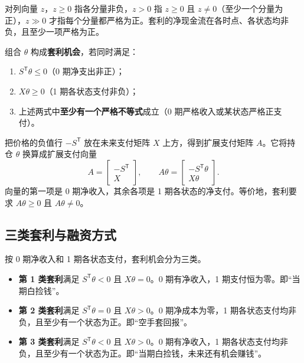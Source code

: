\begin{tcolorbox}[knowledge,title=向量不等号与净现金流]
对列向量 $z$，$z\ge0$ 指各分量非负，$z>0$ 指 $z\ge0$ 且 $z\ne0$（至少一个分量为正），$z\gg0$ 才指每个分量都严格为正。套利的净现金流在各时点、各状态均非负，且至少一项严格为正。
\end{tcolorbox}

\begin{tcolorbox}[knowledge]
组合 $\theta$ 构成\textbf{套利机会}，若同时满足：
\begin{enumerate}
    \item $S^{\mathsf T}\theta\le 0$（0 期净支出非正）；
    \item $X\theta\ge 0$（1 期各状态支付非负）；
    \item 上述两式中\textbf{至少有一个严格不等式}成立（0 期严格收入或某状态严格正支付）。
\end{enumerate}
把价格的负值行 $-S^{\mathsf T}$ 放在未来支付矩阵 $X$ 上方，得到扩展支付矩阵 $A$。它将持仓 $\theta$ 换算成扩展支付向量
\[
 A=\begin{bmatrix}-S^{\mathsf T}\\ X\end{bmatrix},
 \qquad
 A\theta=\begin{bmatrix}-S^{\mathsf T}\theta\\ X\theta\end{bmatrix}.
\]
向量的第一项是 0 期净收入，其余各项是 1 期各状态的净支付。等价地，套利要求 $A\theta\ge0$ 且 $A\theta\ne0$。
\end{tcolorbox}

\subsection{三类套利与融资方式}
\begin{tcolorbox}[knowledge,title=三类套利]
按 0 期净收入和 1 期各状态支付，套利机会分为三类。
\begin{itemize}
    \item \textbf{第 1 类套利}满足 $S^{\mathsf T}\theta<0$ 且 $X\theta=0$。0 期有净收入，1 期支付恒为零。\mbox{即“当期白捡钱”。}
    \item \textbf{第 2 类套利}满足 $S^{\mathsf T}\theta=0$ 且 $X\theta>0$。0 期净成本为零，1 期各状态支付均非负，且至少有一个状态为正。即“空手套回报”。
    \item \textbf{第 3 类套利}满足 $S^{\mathsf T}\theta<0$ 且 $X\theta>0$。0 期有净收入，1 期各状态支付均非负，且至少有一个状态为正。即“当期白捡钱，未来还有机会赚钱”。
\end{itemize}
\end{tcolorbox}

